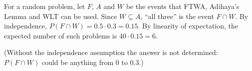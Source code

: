 For a random problem, let $F$, $A$ and $W$ be the events that FTWA, Adihaya's Lemma and WLT can be used. Since $W\subseteq A$, ``all three'' is the event $F\cap W$. By independence, $P(F\cap W)=0.5\cdot0.3=0.15$. By linearity of expectation, the expected number of such problems is $40\cdot0.15=\boxed{6}$.

(Without the independence assumption the answer is not determined: $P(F\cap W)$ could be anything from $0$ to $0.3$.)
